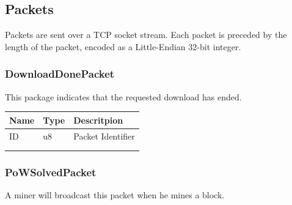 \documentclass[../documentation.tex]{subfiles}
\begin{document}
\hypertarget{packets}{}
\subsection{Packets}

Packets are sent over a TCP socket stream.
Each packet is preceded by the length of the packet,
encoded as a Little-Endian 32-bit integer.


\newcommand{\tline}{
    \\ \hline
}

\newcommand{\packettabular}[1]{
    \bgroup{}
    \def\arraystretch{1.25}
    \begin{center}
        \begin{tabular}{|l|l|l|}
            \hline
            \textbf{Name} & \textbf{Type} & \textbf{Descritpion}
            \tline
            ID & u8 & Packet Identifier
            \tline

            \if\relax\detokenize{#1}\relax
            \else
                #1
                \tline
            \fi
        \end{tabular}
    \end{center}
    \egroup{}
}

\newcommand{\packettabularnoid}[1]{
    \bgroup{}
    \def\arraystretch{1.25}
    \begin{center}
        \begin{tabular}{|l|l|l|}
            \hline
            \textbf{Name} & \textbf{Type} & \textbf{Descritpion}
            \tline

            \if\relax\detokenize{#1}\relax
            \else
                #1
                \tline
            \fi
        \end{tabular}
    \end{center}
    \egroup{}
}

\subsubsection{DownloadDonePacket}

This package indicates that the requested download has ended.

\packettabular{}

\subsubsection{PoWSolvedPacket}

A miner will broadcast this packet when he mines a block.
\end{document}
